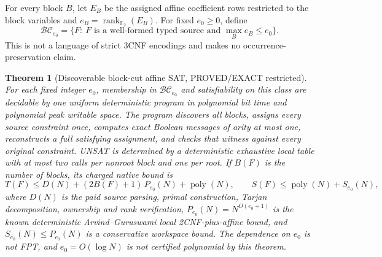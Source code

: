 \documentclass[10pt]{article}
\newtheorem{theorem}{Theorem}
\newcommand{\F}{\mathbb F_2}
\begin{document}
For every block $B$, let $E_B$ be the assigned affine coefficient rows restricted to the block variables and $e_B=\operatorname{rank}_{\F}(E_B)$. For fixed $e_0\ge0$, define
\[
 \mathcal{BC}_{e_0}=\{F:\ F\text{ is a well-formed typed source and }\max_B e_B\le e_0\}.
\]
This is not a language of strict 3CNF encodings and makes no occurrence-preservation claim.

\begin{theorem}[Discoverable block-cut affine SAT, PROVED/EXACT restricted]\label{th:block}
For each fixed integer $e_0$, membership in $\mathcal{BC}_{e_0}$ and satisfiability on this class are decidable by \emph{one} uniform deterministic program in polynomial bit time and polynomial peak writable space. The program discovers all blocks, assigns every source constraint once, computes exact Boolean messages of arity at most one, reconstructs a full satisfying assignment, and checks that witness against every original constraint. UNSAT is determined by a deterministic exhaustive local table with at most two calls per nonroot block and one per root. If $B(F)$ is the number of blocks, its charged native bound is
\[
 T(F)\le D(N)+(2B(F)+1)\,P_{e_0}(N)+\operatorname{poly}(N),\qquad
 S(F)\le\operatorname{poly}(N)+S_{e_0}(N),
\]
where $D(N)$ is the paid source parsing, primal construction, Tarjan decomposition, ownership and rank verification, $P_{e_0}(N)=N^{O(e_0+1)}$ is the \emph{known} deterministic Arvind--Guruswami local 2CNF-plus-affine bound, and $S_{e_0}(N)\le P_{e_0}(N)$ is a conservative workspace bound. The dependence on $e_0$ is not FPT, and $e_0=O(\log N)$ is not certified polynomial by this theorem.
\end{theorem}
\end{document}
